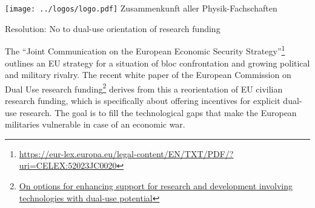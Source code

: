 \documentclass[DIV=calc]{scrartcl}
\begin{document}
\hspace{0.87\textwidth}
\begin{minipage}{120pt}
	\vspace{-1.8cm}
	\texttt{[image: ../logos/logo.pdf]}
	\centering
	\small Zusammenkunft aller Physik-Fachschaften
\end{minipage}

\begin{center}
  \huge{Resolution: No to dual-use orientation of research funding}\vspace{.25\baselineskip}\\
  \normalsize
\end{center}
\vspace{1cm}







The ``Joint Communication on the European Economic Security Strategy''\footnote{\url{https://eur-lex.europa.eu/legal-content/EN/TXT/PDF/?uri=CELEX:52023JC0020}} outlines an EU strategy for a situation of bloc confrontation and growing political and military rivalry. The recent white paper of the European Commission on Dual Use research funding\footnote{\href{https://research-and-innovation.ec.europa.eu/system/files/2024-01/ec_rtd_white-paper-dual-use-potential.pdf}{On options for enhancing support for research and development involving technologies with dual-use potential}} derives from this a reorientation of EU civilian research funding, which is specifically about offering incentives for explicit dual-use research. The goal is to fill the technological gaps that make the European militaries vulnerable in case of an economic war.
\end{document}
